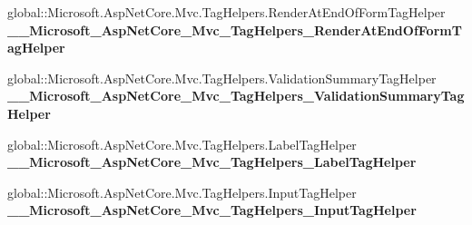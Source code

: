 \begin{DoxyCompactItemize}
\item 
\mbox{\label{class_projeto_e_s_w_1_1_areas_1_1_identity_1_1_pages_1_1_account_1_1_areas___identity___pages___account___login_a5b7c3252807b3c3b2987cd16f6ce899f}} 
global\+::\+Microsoft.\+Asp\+Net\+Core.\+Mvc.\+Tag\+Helpers.\+Render\+At\+End\+Of\+Form\+Tag\+Helper {\bfseries \+\_\+\+\_\+\+Microsoft\+\_\+\+Asp\+Net\+Core\+\_\+\+Mvc\+\_\+\+Tag\+Helpers\+\_\+\+Render\+At\+End\+Of\+Form\+Tag\+Helper}
\item 
\mbox{\label{class_projeto_e_s_w_1_1_areas_1_1_identity_1_1_pages_1_1_account_1_1_areas___identity___pages___account___login_a2590ab29ca11c8acaf5f8a20f596f492}} 
global\+::\+Microsoft.\+Asp\+Net\+Core.\+Mvc.\+Tag\+Helpers.\+Validation\+Summary\+Tag\+Helper {\bfseries \+\_\+\+\_\+\+Microsoft\+\_\+\+Asp\+Net\+Core\+\_\+\+Mvc\+\_\+\+Tag\+Helpers\+\_\+\+Validation\+Summary\+Tag\+Helper}
\item 
\mbox{\label{class_projeto_e_s_w_1_1_areas_1_1_identity_1_1_pages_1_1_account_1_1_areas___identity___pages___account___login_abf76264f87bc0ba5e01efe061c567744}} 
global\+::\+Microsoft.\+Asp\+Net\+Core.\+Mvc.\+Tag\+Helpers.\+Label\+Tag\+Helper {\bfseries \+\_\+\+\_\+\+Microsoft\+\_\+\+Asp\+Net\+Core\+\_\+\+Mvc\+\_\+\+Tag\+Helpers\+\_\+\+Label\+Tag\+Helper}
\item 
\mbox{\label{class_projeto_e_s_w_1_1_areas_1_1_identity_1_1_pages_1_1_account_1_1_areas___identity___pages___account___login_a48525bc2ba12a728d6556855f5b5e31e}} 
global\+::\+Microsoft.\+Asp\+Net\+Core.\+Mvc.\+Tag\+Helpers.\+Input\+Tag\+Helper {\bfseries \+\_\+\+\_\+\+Microsoft\+\_\+\+Asp\+Net\+Core\+\_\+\+Mvc\+\_\+\+Tag\+Helpers\+\_\+\+Input\+Tag\+Helper}
\item 
\mbox{\label{class_projeto_e_s_w_1_1_areas_1_1_identity_1_1_pages_1_1_account_1_1_areas___identity___pages___account___login_a3af7a1d27a80e23999e4c992a69008a1}} 

\end{DoxyCompactItemize}
